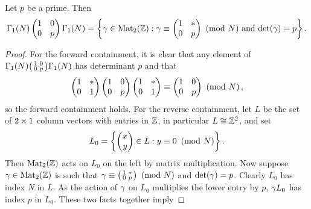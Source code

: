     \begin{lemma}\label{lem:cosets_for_Hecke_operators}
      Let $p$ be a prime. Then
      \[
        \Gamma_{1}(N)\begin{pmatrix} 1 & 0 \\ 0 & p \end{pmatrix}\Gamma_{1}(N) = \left\{\gamma \in \mathrm{Mat}_{2}(\mathbb{Z}):\text{$\gamma \equiv \begin{pmatrix} 1 & \ast \\ 0 & p \end{pmatrix} \ \left(\text{mod }N\right)$ and $\det(\gamma) = p$}\right\}.
      \]
    \end{lemma}
    \begin{proof}
      For the forward containment, it is clear that any element of $\Gamma_{1}(N)\begin{psmallmatrix} 1 & 0 \\ 0 & p \end{psmallmatrix}\Gamma_{1}(N)$ has determinant $p$ and that
      \[
        \begin{pmatrix} 1 & \ast \\ 0 & 1 \end{pmatrix}\begin{pmatrix} 1 & 0 \\ 0 & p \end{pmatrix}\begin{pmatrix} 1 & \ast \\ 0 & 1 \end{pmatrix} \equiv \begin{pmatrix} 1 & 0 \\ 0 & p \end{pmatrix} \ \left(\text{mod }N\right),
      \]
      so the forward containment holds. For the reverse containment, let $L$ be the set of $2 \times 1$ column vectors with entries in $\mathbb{Z}$, in particular $L \cong \mathbb{Z}^{2}$, and set
      \[
        L_{0} = \left\{\begin{pmatrix} x \\ y \end{pmatrix} \in L: y \equiv 0 \ \left(\text{mod }N\right) \right\}.
      \]
      Then $\mathrm{Mat}_{2}(\mathbb{Z})$ acts on $L_{0}$ on the left by matrix multiplication. Now suppose $\gamma \in \mathrm{Mat}_{2}(\mathbb{Z})$ is such that $\gamma \equiv \begin{psmallmatrix} 1 & \ast \\ 0 & p \end{psmallmatrix} \ \left(\text{mod }N\right)$ and $\det(\gamma) = p$. Clearly $L_{0}$ has index $N$ in $L$. As the action of $\gamma$ on $L_{0}$ multiplies the lower entry by $p$, $\gamma L_{0}$ has index $p$ in $L_{0}$. These two facts together imply

\end{proof}
